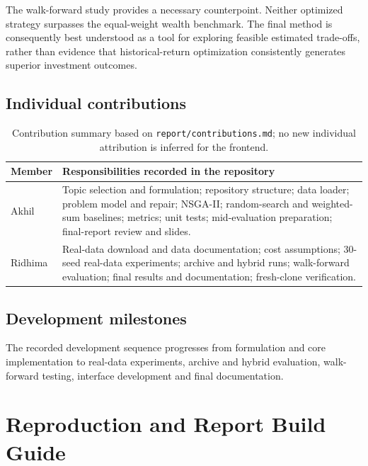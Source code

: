 \documentclass[12pt,a4paper]{article}
\begin{document}
The walk-forward study provides a necessary counterpoint. Neither optimized strategy surpasses the equal-weight wealth benchmark. The final method is consequently best understood as a tool for exploring feasible estimated trade-offs, rather than evidence that historical-return optimization consistently generates superior investment outcomes.
\subsection{Individual contributions}
\begin{table}[H]\centering
\begin{tabularx}{\linewidth}{@{}p{30mm}Y@{}}\toprule
Member & Responsibilities recorded in the repository\\\midrule
Akhil & Topic selection and formulation; repository structure; data loader; problem model and repair; NSGA-II; random-search and weighted-sum baselines; metrics; unit tests; mid-evaluation preparation; final-report review and slides.\\
Ridhima & Real-data download and data documentation; cost assumptions; 30-seed real-data experiments; archive and hybrid runs; walk-forward evaluation; final results and documentation; fresh-clone verification.\\\bottomrule
\end{tabularx}
\caption{Contribution summary based on \texttt{report/contributions.md}; no new individual attribution is inferred for the frontend.}
\end{table}
\subsection{Development milestones}
The recorded development sequence progresses from formulation and core implementation to real-data experiments, archive and hybrid evaluation, walk-forward testing, interface development and final documentation.

\clearpage\appendix
\section{Reproduction and Report Build Guide}\label{app:reproduce}
\end{document}
